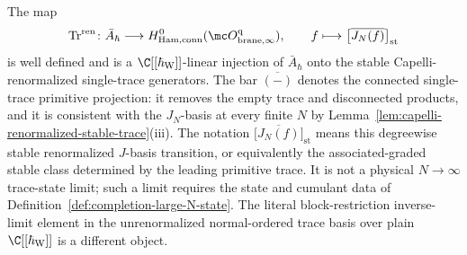 \documentclass[11pt]{memoir}
\begin{document}
\begin{cor}\label{cor:renormalized-stable-connected-map}
  The map
  $$\mathrm{Tr}^{\mathrm{ren}}\colon\bar A_\hbar\longrightarrow
    H^0_{\mathrm{Ham,conn}}(\mc O^{\mathrm q}_{\mathrm{brane},\infty}),
    \qquad f\longmapsto
      \bigl[\overline{J_N(f)}\bigr]_{\mathrm{st}}$$
  is well defined and is a \(\C[[\hbar_{\mathrm{W}}]]\)-linear injection of $\bar A_\hbar$
  onto the stable Capelli-renormalized single-trace generators. The bar
  $\overline{(-)}$ denotes the connected single-trace primitive projection:
  it removes the empty trace and disconnected products, and it is
  consistent with the $J_N$-basis at every finite $N$ by
  Lemma~\ref{lem:capelli-renormalized-stable-trace}(iii).  The notation
  \(\bigl[\overline{J_N(f)}\bigr]_{\mathrm{st}}\) means this
  degreewise stable renormalized \(J\)-basis transition, or equivalently
  the associated-graded stable class determined by the leading primitive
  trace.  It is not a physical \(N\to\infty\) trace-state limit; such a
  limit requires the state and cumulant data of
  Definition~\ref{def:completion-large-N-state}.  The literal
  block-restriction inverse-limit element in the unrenormalized
  normal-ordered trace basis over plain \(\C[[\hbar_{\mathrm{W}}]]\) is a different
  object.
\end{cor}
\end{document}
